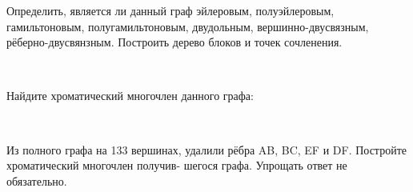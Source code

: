 
\renewcommand*{\proofname}{Решение}
\begin{problem}
	Определить, является ли данный граф эйлеровым, полуэйлеровым, гамильтоновым, полугамильтоновым, двудольным, вершинно-двусвязным, рёберно-двусвянзным. Построить дерево блоков и точек сочленения.
    \begin{center}
    \\
    \end{center}
\end{problem}



\begin{problem}
Найдите хроматический многочлен данного графа:
\begin{center}
    \\
    \end{center}
\end{problem}


\begin{problem}
Из полного графа на 133 вершинах, удалили рёбра AB,
BC, EF и DF. Постройте хроматический многочлен получив-
шегося графа. Упрощать ответ не обязательно.
\end{problem}


